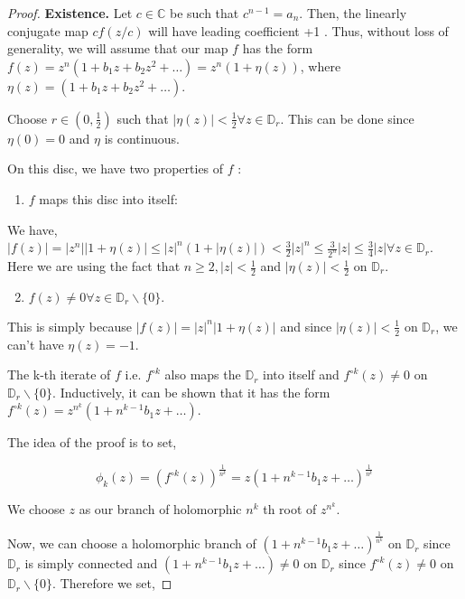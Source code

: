 \begin{proof}
	\textbf{Existence.} Let $c \in \mathbb{C}$ be such that $c^{n-1}=a_{n}$. Then, the linearly conjugate map $c f(z / c)$ will have leading coefficient +1 . Thus, without loss of generality, we will assume that our map $f$ has the form $f(z)=z^{n}\left(1+b_{1} z+b_{2} z^{2}+\ldots\right)=z^{n}(1+\eta(z))$, where $\eta(z)=\left(1+b_{1} z+b_{2} z^{2}+\ldots\right)$.

Choose $r \in\left(0, \frac{1}{2}\right)$ such that $|\eta(z)|<\frac{1}{2} \forall z \in \mathbb{D}_{r}$. This can be done since $\eta(0)=0$ and $\eta$ is continuous.

On this disc, we have two properties of $f$ :

\begin{enumerate}
  \item $f$ maps this disc into itself:
\end{enumerate}

We have, $|f(z)|=\left|z^{n}\right||1+\eta(z)| \leq|z|^{n}(1+|\eta(z)|)<\frac{3}{2}|z|^{n} \leq \frac{3}{2^{n}}|z| \leq \frac{3}{4}|z| \forall z \in \mathbb{D}_{r}$. Here we are using the fact that $n \geq 2,|z|<\frac{1}{2}$ and $|\eta(z)|<\frac{1}{2}$ on $\mathbb{D}_{r}$.

\begin{enumerate}
  \setcounter{enumi}{1}
  \item $f(z) \neq 0 \forall z \in \mathbb{D}_{r} \backslash\{0\}.$
\end{enumerate}

This is simply because $|f(z)|=|z|^{n}|1+\eta(z)|$ and since $|\eta(z)|<\frac{1}{2}$ on $\mathbb{D}_{r}$, we can't have $\eta(z)=-1$.

The k-th iterate of $f$ i.e. $f^{\circ k}$ also maps the $\mathbb{D}_{r}$ into itself and $f^{\circ k}(z) \neq 0$ on $\mathbb{D}_{r} \backslash\{0\}$. Inductively, it can be shown that it has the form $f^{\circ k}(z)=z^{n^{k}}\left(1+n^{k-1} b_{1} z+\ldots\right)$.

The idea of the proof is to set,

$$
\phi_{k}(z)=\left(f^{\circ k}(z)\right)^{\frac{1}{n^{k}}}=z\left(1+n^{k-1} b_{1} z+\ldots\right)^{\frac{1}{n^{k}}}
$$

We choose $z$ as our branch of holomorphic $n^{k}$ th root of $z^{n^{k}}$.

Now, we can choose a holomorphic branch of $\left(1+n^{k-1} b_{1} z+\ldots\right)^{\frac{1}{n^{k}}}$ on $\mathbb{D}_{r}$ since $\mathbb{D}_{r}$ is simply connected and $\left(1+n^{k-1} b_{1} z+\ldots\right) \neq 0$ on $\mathbb{D}_{r}$ since $f^{\circ k}(z) \neq 0$ on $\mathbb{D}_{r} \backslash\{0\}$. Therefore we set,


\end{proof}
